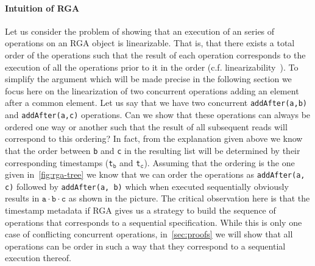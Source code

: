 

\paragraph{Intuition of RGA \CRDTLinshort{}}
Let us consider the problem of showing that an execution of an series
of operations on an RGA object is linearizable.
%
That is, that there exists a total order of the operations such that
the result of each operation corresponds to the execution of all the
operations prior to it in the order (c.f.
linearizability~\cite{HerlihyW90}).
%
To simplify the argument which will be made precise in the following
section we focus here on the linearization of two concurrent
operations adding an element after a common element.
%
Let us say that we have two concurrent \lstinline|addAfter(a,b)| and
\lstinline|addAfter(a,c)| operations.
%
Can we show that these operations can always be ordered one way or
another such that the result of all subsequent reads will correspond
to this ordering?
%
In fact, from the explanation given above we know that the order
between \lstinline|b| and \lstinline|c| in the resulting list will be
determined by their corresponding timestamps
(\lstinline|t|$_{\mathtt{b}}$ and \lstinline|t|$_{\mathtt{c}}$).
%
Assuming that the ordering is the one given in~\autoref{fig:rga-tree}
we know that we can order the operations as \lstinline|addAfter(a, c)|
followed by \lstinline|addAfter(a, b)| which when executed
sequentially obviously results in $\mathtt{a \cdot b \cdot c}$ as
shown in the picture.
%
The critical observation here is that the timestamp metadata if RGA
gives us a strategy to build the sequence of operations that
corresponds to a sequential specification.
%
While this is only one case of conflicting concurrent operations,
in~\autoref{sec:proofs} we will show that all operations can be order
in such a way that they correspond to a sequential execution thereof.



